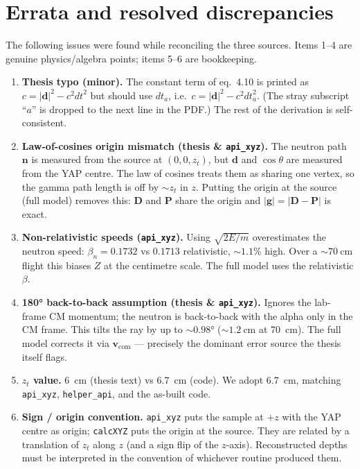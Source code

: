 \documentclass[11pt]{article}
\newcommand{\code}[1]{\texttt{\small #1}}
\newcommand{\dta}{\mathit{dt}_a}
\newcommand{\dt}{\mathit{dt}}
\begin{document}
\section{Errata and resolved discrepancies}
The following issues were found while reconciling the three sources. Items 1--4
are genuine physics/algebra points; items 5--6 are bookkeeping.
\begin{enumerate}[leftmargin=1.5em,itemsep=4pt]
  \item \textbf{Thesis typo (minor).} The constant term of eq.~4.10 is printed as
        $c=|\bm d|^2-c^2\dt^2$ but should use $\dta$, i.e.\
        $c=|\bm d|^2-c^2\dta^2$. (The stray subscript ``$a$'' is dropped to the
        next line in the PDF.) The rest of the derivation is self-consistent.
  \item \textbf{Law-of-cosines origin mismatch (thesis \& \code{api\_xyz}).} The
        neutron path $\bm n$ is measured from the source at $(0,0,z_t)$, but
        $\bm d$ and $\cos\theta$ are measured from the YAP centre. The law of
        cosines treats them as sharing one vertex, so the gamma path length is
        off by ${\sim}z_t$ in $z$. Putting the origin at the source (full model)
        removes this: $\bm D$ and $\bm P$ share the origin and
        $|\bm g|=|\bm D-\bm P|$ is exact.
  \item \textbf{Non-relativistic speeds (\code{api\_xyz}).} Using $\sqrt{2E/m}$
        overestimates the neutron speed: $\beta_n=0.1732$ vs $0.1713$
        relativistic, ${\sim}1.1\%$ high. Over a ${\sim}\SI{70}{\cm}$ flight
        this biases $Z$ at the centimetre scale. The full model uses the
        relativistic $\beta$.
  \item \textbf{\ang{180} back-to-back assumption (thesis \& \code{api\_xyz}).}
        Ignores the lab-frame CM momentum; the neutron is back-to-back with the
        alpha only in the CM frame. This tilts the ray by up to
        ${\sim}\ang{0.98}$ (${\sim}\SI{1.2}{\cm}$ at \SI{70}{\cm}).
        The full model corrects it via $\bm v_{\mathrm{com}}$ --- precisely the
        dominant error source the thesis itself flags.
  \item \textbf{$z_t$ value.} \SI{6}{\cm} (thesis text) vs \SI{6.7}{\cm} (code).
        We adopt \SI{6.7}{\cm}, matching \code{api\_xyz}, \code{helper\_api}, and
        the as-built code.
  \item \textbf{Sign / origin convention.} \code{api\_xyz} puts the sample at
        $+z$ with the YAP centre as origin; \code{calcXYZ} puts the origin at the
        source. They are related by a translation of $z_t$ along $z$ (and a sign
        flip of the $z$-axis). Reconstructed depths must be interpreted in the
        convention of whichever routine produced them.
\end{enumerate}
\end{document}
